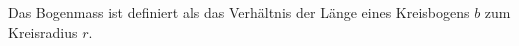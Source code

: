 
Das Bogenmass ist definiert als das Verhältnis der Länge eines Kreisbogens $b$ zum Kreisradius $r$.
